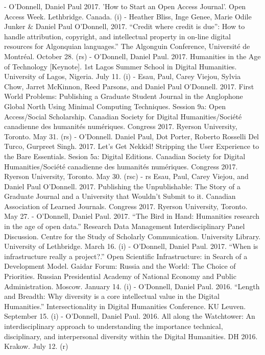 - O'Donnell, Daniel Paul 2017. 'How to Start an Open Access Journal'. Open Access Week. Lethbridge. Canada. (i)
- Heather Bliss\*, Inge Genee, Marie Odile Junker & Daniel Paul O’Donnell, 2017. “Credit where credit is due”: How to handle attribution, copyright, and intellectual property in on-line digital resources for Algonquian languages.” The Algonguin Conference, Université de Montréal. October 28. (rs)
- O’Donnell, Daniel Paul. 2017. Humanities in the Age of Technology [Keynote]. 1st Lagos Summer School in Digital Humanities. University of Lagos, Nigeria. July 11. (i)
- Esau\*, Paul, Carey Viejou\*, Sylvia Chow\*, Jarret McKinnon\*, Reed Parsons\*, and Daniel Paul O'Donnell. 2017. First World Problems: Publishing a Graduate Student Journal in the Anglophone Global North Using Minimal Computing Techniques. Session 9a: Open Access/\allowbreak{}Social Scholarship. Canadian Society for Digital Humanities/\allowbreak{}Société canadienne des humanités numériques. Congress 2017. Ryerson University, Toronto. May 31. (rs)
- O’Donnell. Daniel Paul, Dot Porter, Roberto Rosselli Del Turco, Gurpreet Singh\*. 2017. Let’s Get Nekkid! Stripping the User Experience to the Bare Essentials. Sesion 5a: Digital Editions. Canadian Society for Digital Humanities/\allowbreak{}Société canadienne des humanités numériques. Congress 2017. Ryerson University, Toronto. May 30. (rsc)
- rs Esau\*, Paul, Carey Viejou\*, and Daniel Paul O’Donnell. 2017. Publishing the Unpublishable: The Story of a Graduate Journal and a University that Wouldn’t Submit to it. Canadian Association of Learned Journals. Congress 2017. Ryerson University, Toronto. May 27.
- O’Donnell, Daniel Paul. 2017. “The Bird in Hand: Humanities research in the age of open data.” Research Data Management Interdisciplinary Panel Discussion. Centre for the Study of Scholarly Communication. University Library. University of Lethbridge. March 16. (i)
- O’Donnell, Daniel Paul. 2017. “When is infrastructure really a project?.” Open Scientific Infrastructure: in Search of a Development Model. Gaidar Forum: Russia and the World: The Choice of Priorities. Russian Presidential Academy of National Economy and Public Administration. Moscow. January 14. (i)
- O’Donnell, Daniel Paul. 2016. “Length and Breadth: Why diversity is a core intellectual value in the Digital Humanities.” Intersectionality in Digital Humanities Conference. KU Leuven. September 15. (i)
- O’Donnell, Daniel Paul. 2016. All along the Watchtower: An interdisciplinary approach to understanding the importance technical, disciplinary, and interpersonal diversity within the Digital Humanities. DH 2016. Krakow. July 12. (r)
